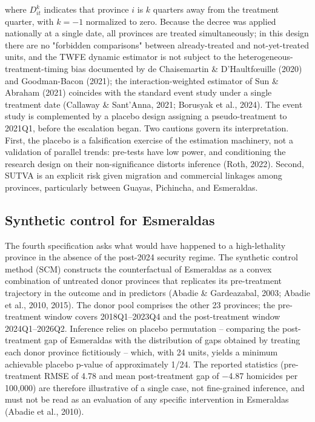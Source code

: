 where $D^k_{it}$ indicates that province $i$ is $k$ quarters away from the treatment quarter, with $k = -1$ normalized to zero. Because the decree was applied nationally at a single date, all provinces are treated simultaneously; in this design there are no "forbidden comparisons" between already-treated and not-yet-treated units, and the TWFE dynamic estimator is not subject to the heterogeneous-treatment-timing bias documented by de Chaisemartin \& D'Haultf{\oe}uille (2020) and Goodman-Bacon (2021); the interaction-weighted estimator of Sun \& Abraham (2021) coincides with the standard event study under a single treatment date (Callaway \& Sant'Anna, 2021; Borusyak et al., 2024). The event study is complemented by a placebo design assigning a pseudo-treatment to 2021Q1, before the escalation began. Two cautions govern its interpretation. First, the placebo is a falsification exercise of the estimation machinery, not a validation of parallel trends: pre-tests have low power, and conditioning the research design on their non-significance distorts inference (Roth, 2022). Second, SUTVA is an explicit risk given migration and commercial linkages among provinces, particularly between Guayas, Pichincha, and Esmeraldas.



\subsection{Synthetic control for Esmeraldas}



The fourth specification asks what would have happened to a high-lethality province in the absence of the post-2024 security regime. The synthetic control method (SCM) constructs the counterfactual of Esmeraldas as a convex combination of untreated donor provinces that replicates its pre-treatment trajectory in the outcome and in predictors (Abadie \& Gardeazabal, 2003; Abadie et al., 2010, 2015). The donor pool comprises the other 23 provinces; the pre-treatment window covers 2018Q1--2023Q4 and the post-treatment window 2024Q1--2026Q2. Inference relies on placebo permutation -- comparing the post-treatment gap of Esmeraldas with the distribution of gaps obtained by treating each donor province fictitiously -- which, with 24 units, yields a minimum achievable placebo p-value of approximately 1/24. The reported statistics (pre-treatment RMSE of 4.78 and mean post-treatment gap of $-$4.87 homicides per 100,000) are therefore illustrative of a single case, not fine-grained inference, and must not be read as an evaluation of any specific intervention in Esmeraldas (Abadie et al., 2010).



